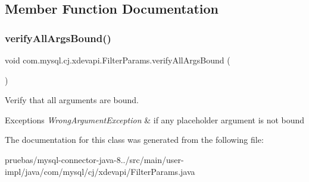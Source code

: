 \subsection{Member Function Documentation}
\mbox{\label{classcom_1_1mysql_1_1cj_1_1xdevapi_1_1_filter_params_a404c1357e69a9ae03bcc221bed29701e}} 
\subsubsection{\texorpdfstring{verify\+All\+Args\+Bound()}{verifyAllArgsBound()}}
{\footnotesize\ttfamily void com.\+mysql.\+cj.\+xdevapi.\+Filter\+Params.\+verify\+All\+Args\+Bound (\begin{DoxyParamCaption}{ }\end{DoxyParamCaption})}

Verify that all arguments are bound.


\begin{DoxyExceptions}{Exceptions}
{\em Wrong\+Argument\+Exception} & if any placeholder argument is not bound \\
\hline
\end{DoxyExceptions}


The documentation for this class was generated from the following file\+:\begin{DoxyCompactItemize}
\item 
pruebas/mysql-\/connector-\/java-\/8../src/main/user-\/impl/java/com/mysql/cj/xdevapi/Filter\+Params.\+java\end{DoxyCompactItemize}
